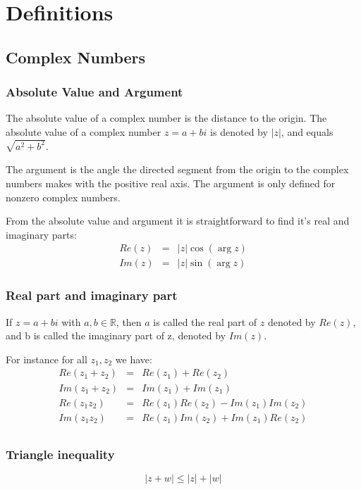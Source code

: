 \documentclass{article}
\begin{document}
	\section{Definitions}
		\subsection{Complex Numbers}
			\subsubsection{Absolute Value and Argument}
			The absolute value of a complex number is the distance to the origin. The absolute value of a complex number $z=a+bi$ is denoted by $|z|$, and equals $\sqrt{a^2+b^2}$.
			
			The argument is the angle the directed segment from the origin to the complex numbers makes with the positive real axis. The argument is only defined for nonzero complex numbers.
			
			From the absolute value and argument it is straightforward to find it's real and imaginary parts:
			\begin{eqnarray*}
				Re(z) &=& |z|\cos{(\arg{z})} \\
				Im(z) &=& |z|\sin{(\arg{z})}
			\end{eqnarray*}
			\subsubsection{Real part and imaginary part}
			If $z = a+bi$ with $a,b \in \mathbb{R}$, then $a$ is called the real part of $z$ denoted by $Re(z)$, and b is called the imaginary part of z, denoted by $Im(z)$.
			
			For instance for all $z_1,z_2$ we have:
			\begin{eqnarray*}
				Re(z_1+z_2) &=& Re(z_1) + Re(z_2) \\
				Im(z_1+z_2) &=& Im(z_1) + Im(z_1) \\
				Re(z_1z_2) &=& Re(z_1)Re(z_2) - Im(z_1)Im(z_2) \\
				Im(z_1z_2) &=& Re(z_1)Im(z_2) + Im(z_1)Re(z_2) \\
			\end{eqnarray*}
		
			\subsubsection{Triangle inequality}
			\begin{equation*}
				|z + w| \leq |z| + |w|
			\end{equation*}
			
\end{document}
